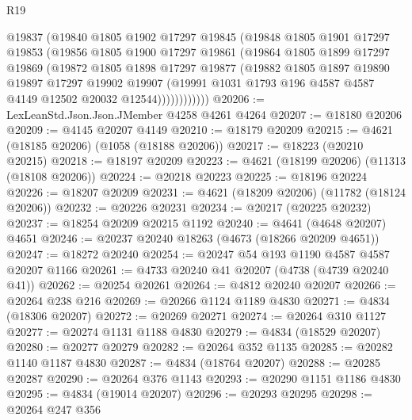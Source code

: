 \begin{lexlean}{R19}
\begin{coremodule}
              @19837
              (@19840
                @1805
                @1902
                @17297
                @19845
                (@19848
                  @1805
                  @1901
                  @17297
                  @19853
                  (@19856
                    @1805
                    @1900
                    @17297
                    @19861
                    (@19864
                      @1805
                      @1899
                      @17297
                      @19869
                      (@19872
                        @1805
                        @1898
                        @17297
                        @19877
                        (@19882
                          @1805
                          @1897
                          @19890
                          @19897
                          @17297
                          @19902
                          @19907
                          (@19991
                            @1031
                            @1793
                            @196
                            @4587
                            @4587
                            @4149
                            @12502
                            @20032
                            @12544))))))))))))
@20206 := LexLeanStd.Json.Json.JMember @4258 @4261 @4264
@20207 := @18180 @20206
@20209 := @4145 @20207 @4149
@20210 := @18179 @20209
@20215 := @4621 (@18185 @20206) (@1058 (@18188 @20206))
@20217 := @18223 (@20210 @20215)
@20218 := @18197 @20209
@20223 := @4621 (@18199 @20206) (@11313 (@18108 @20206))
@20224 := @20218 @20223
@20225 := @18196 @20224
@20226 := @18207 @20209
@20231 := @4621 (@18209 @20206) (@11782 (@18124 @20206))
@20232 := @20226 @20231
@20234 := @20217 (@20225 @20232)
@20237 := @18254 @20209 @20215 @1192
@20240 := @4641 (@4648 @20207) @4651
@20246 := @20237 @20240 @18263 (@4673 (@18266 @20209 @4651))
@20247 := @18272 @20240
@20254 := @20247 @54 @193 @1190 @4587 @4587 @20207 @1166
@20261 := @4733 @20240 @41 @20207 (@4738 (@4739 @20240 @41))
@20262 := @20254 @20261
@20264 := @4812 @20240 @20207
@20266 := @20264 @238 @216
@20269 := @20266 @1124 @1189 @4830
@20271 := @4834 (@18306 @20207)
@20272 := @20269 @20271
@20274 := @20264 @310 @1127
@20277 := @20274 @1131 @1188 @4830
@20279 := @4834 (@18529 @20207)
@20280 := @20277 @20279
@20282 := @20264 @352 @1135
@20285 := @20282 @1140 @1187 @4830
@20287 := @4834 (@18764 @20207)
@20288 := @20285 @20287
@20290 := @20264 @376 @1143
@20293 := @20290 @1151 @1186 @4830
@20295 := @4834 (@19014 @20207)
@20296 := @20293 @20295
@20298 := @20264 @247 @356

\end{coremodule}
\end{lexlean}

